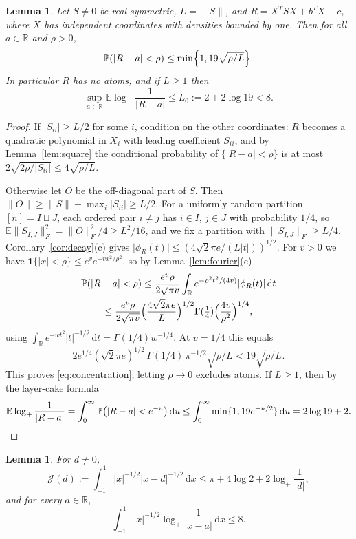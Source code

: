 \documentclass[11pt]{amsart}
\numberwithin{equation}{section}
\newtheorem{lemma}[theorem]{Lemma}
\theoremstyle{definition}
\theoremstyle{remark}
\newcommand{\R}{\mathbb R}
\newcommand{\E}{\mathbb E}
\newcommand{\PP}{\mathbb P}
\newcommand{\1}{\mathbf 1}
\newcommand{\dd}{\,\mathrm d}
\newcommand{\logp}{\log_+}
\newcommand{\norm}[1]{\lVert #1\rVert}
\newcommand{\abs}[1]{\lvert #1\rvert}
\begin{document}
\begin{lemma}\label{lem:concentration}
Let $S\ne0$ be real symmetric, $L=\norm S$, and $R=X^TSX+b^TX+c$, where $X$ has independent coordinates with densities bounded by one. Then for all $a\in\R$ and $\rho>0$,
\begin{equation}\label{eq:concentration}
\PP(\abs{R-a}<\rho)\le\min\Bigl\{1,19\sqrt{\rho/L}\Bigr\}.
\end{equation}
In particular $R$ has no atoms, and if $L\ge1$ then
\begin{equation}\label{eq:logmoment}
\sup_{a\in\R}\E\logp\frac1{\abs{R-a}}\le L_0:=2+2\log19<8 .
\end{equation}
\end{lemma}

\begin{proof}
If $\abs{S_{ii}}\ge L/2$ for some $i$, condition on the other coordinates: $R$ becomes a quadratic polynomial in $X_i$ with leading coefficient $S_{ii}$, and by Lemma~\ref{lem:square} the conditional probability of $\{\abs{R-a}<\rho\}$ is at most $2\sqrt{2\rho/\abs{S_{ii}}}\le4\sqrt{\rho/L}$.

Otherwise let $O$ be the off-diagonal part of $S$. Then $\norm O\ge\norm S-\max_i\abs{S_{ii}}\ge L/2$. For a uniformly random partition $[n]=I\sqcup J$, each ordered pair $i\ne j$ has $i\in I$, $j\in J$ with probability $1/4$, so $\E\norm{S_{I,J}}_F^2=\norm O_F^2/4\ge L^2/16$, and we fix a partition with $\norm{S_{I,J}}_F\ge L/4$. Corollary~\ref{cor:decay}(c) gives $\abs{\phi_R(t)}\le(4\sqrt2\pi e/(L\abs t))^{1/2}$. For $v>0$ we have $\1\{\abs x<\rho\}\le e^{v}e^{-vx^2/\rho^2}$, so by Lemma~\ref{lem:fourier}(c)
\begin{multline*}
\PP(\abs{R-a}<\rho)\le\frac{e^v\rho}{2\sqrt{\pi v}}\int_\R e^{-\rho^2t^2/(4v)}\abs{\phi_R(t)}\dd t\\
\le\frac{e^v\rho}{2\sqrt{\pi v}}\Bigl(\frac{4\sqrt2\pi e}{L}\Bigr)^{1/2}\Gamma(\tfrac14)\Bigl(\frac{4v}{\rho^2}\Bigr)^{1/4},
\end{multline*}
using $\int_\R e^{-wt^2}\abs t^{-1/2}\dd t=\Gamma(1/4)w^{-1/4}$. At $v=1/4$ this equals
\[
2e^{1/4}(\sqrt2\pi e)^{1/2}\,\Gamma(1/4)\,\pi^{-1/2}\sqrt{\rho/L}<19\sqrt{\rho/L}.
\]
This proves \eqref{eq:concentration}; letting $\rho\to0$ excludes atoms. If $L\ge1$, then by the layer-cake formula
\[
\E\logp\frac1{\abs{R-a}}=\int_0^\infty\PP\bigl(\abs{R-a}<e^{-u}\bigr)\dd u\le\int_0^\infty\min\{1,19e^{-u/2}\}\dd u=2\log19+2 .\qedhere
\]
\end{proof}

\begin{lemma}\label{lem:kernels}
For $d\ne0$,
\begin{equation}\label{eq:J}
\mathcal J(d):=\int_{-1}^1\abs x^{-1/2}\abs{x-d}^{-1/2}\dd x\le\pi+4\log2+2\logp\frac1{\abs d},
\end{equation}
and for every $a\in\R$,
\begin{equation}\label{eq:logkernel}
\int_{-1}^1\abs x^{-1/2}\logp\frac1{\abs{x-a}}\dd x\le8 .
\end{equation}
\end{lemma}
\end{document}
